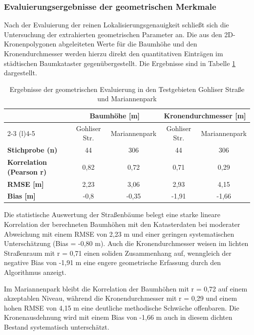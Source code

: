 \subsubsection{Evaluierungsergebnisse der geometrischen Merkmale}

Nach der Evaluierung der reinen Lokalisierungsgenauigkeit schließt sich die Untersuchung der extrahierten geometrischen Parameter an. Die aus den 2D-Kronenpolygonen abgeleiteten Werte für die Baumhöhe und den Kronendurchmesser werden hierzu direkt den quantitativen Einträgen im städtischen Baumkataster gegenübergestellt. Die Ergebnisse sind in Tabelle \ref{tab:evaluierung_geom} dargestellt.

\begin{table}[htbp]
\centering
\caption{Ergebnisse der geometrischen Evaluierung in den Testgebieten Gohliser Straße und Mariannenpark}
\label{tab:evaluierung_geom}
\begin{tabular}{l c c c c}
\toprule
\textbf{} & \multicolumn{2}{c}{\textbf{Baumhöhe [m]}} & \multicolumn{2}{c}{\textbf{Kronendurchmesser [m]}} \\
\cmidrule(r){2-3} \cmidrule(l){4-5}
& Gohliser Str. & Mariannenpark & Gohliser Str. & Mariannenpark \\
\midrule
\textbf{Stichprobe (n)} & 44 & 306 & 44 & 306 \\
\addlinespace
\textbf{Korrelation (Pearson r)} & 0,82 & 0,72 & 0,71 & 0,29 \\
\addlinespace
\textbf{RMSE [m]} & 2,23 & 3,06 & 2,93 & 4,15 \\
\addlinespace
\textbf{Bias [m]} & -0,8 & -0,35 & -1,91 & -1,66 \\
\bottomrule
\end{tabular}
\end{table}

Die statistische Auswertung der Straßenbäume belegt eine starke lineare Korrelation der berechneten Baumhöhen mit den Katasterdaten bei moderater Abweichung mit einem RMSE von 2,23 m und einer geringen systematischen Unterschätzung (Bias = -0,80 m). Auch die Kronendurchmesser weisen im lichten Straßenraum mit r = 0,71 einen soliden Zusammenhang auf, wenngleich der negative Bias von -1,91 m eine engere geometrische Erfassung durch den Algorithmus anzeigt.

Im Mariannenpark bleibt die Korrelation der Baumhöhen mit r = 0,72 auf einem akzeptablen Niveau, während die Kronendurchmesser mit r = 0,29 und einem hohen RMSE von 4,15 m eine deutliche methodische Schwäche offenbaren. Die Kronenausdehnung wird mit einem Bias von -1,66 m auch in diesem dichten Bestand systematisch unterschätzt.

